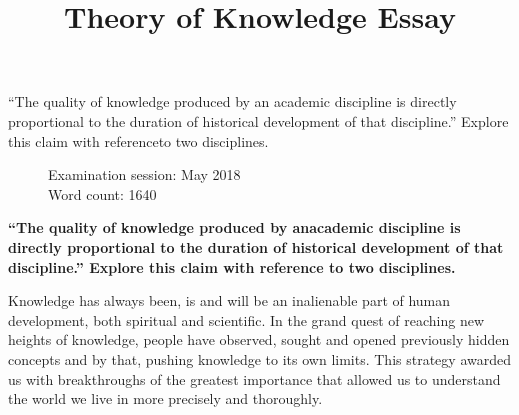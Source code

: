 \documentclass[12pt,a4paper]{article}
\title{Theory of Knowledge Essay}
\author{}
\date{}
\begin{document}

\maketitle

\doublespacing

\begin{center}

  ``The quality of knowledge produced by an academic discipline is directly proportional to the duration of historical development of that discipline.'' Explore this claim with referenceto two disciplines.

\end{center}

\begin{figure}[b]
  \begin{flushleft}
    Examination session: May 2018\\
    Word count: 1640\\
  \end{flushleft}
\end{figure}

\newpage
{}
\begin{center}
  \textbf{``The quality of knowledge produced by anacademic discipline is directly proportional to the duration of historical development of that discipline.'' Explore this claim with reference to two disciplines.}
\end{center}

Knowledge has always been, is and will be an inalienable part of human development, both spiritual and scientific. In the grand quest of reaching new heights of knowledge, people have observed, sought and opened previously hidden concepts and by that, pushing knowledge to its own limits. This strategy awarded us with breakthroughs of the greatest importance that allowed us to understand the world we live in more precisely and thoroughly. \\
\end{document}

